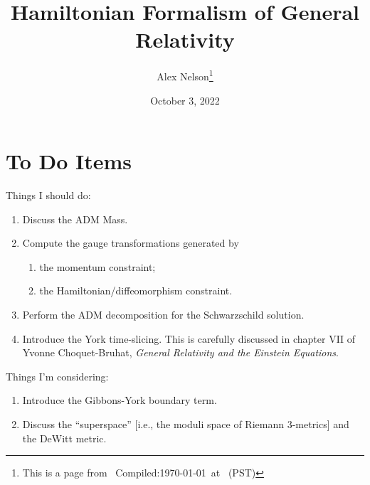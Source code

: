 \documentclass{article}
\title{Hamiltonian Formalism of General Relativity}
\author{Alex Nelson\thanks{This is a page from \homeurl{}\hfil\break\indent\;\, Compiled:\enspace\today\ at \currenttime\ (PST)}}
\date{October 3, 2022}
\numberwithin{equation}{section}
\begin{document}
\maketitle








\section*{To Do Items}

Things I should do:
\begin{enumerate}
\item Discuss the ADM Mass.
\item Compute the gauge transformations generated by
  \begin{enumerate}
  \item the momentum constraint;
  \item the Hamiltonian/diffeomorphism constraint.
  \end{enumerate}
\item Perform the ADM decomposition for the Schwarzschild solution.
\item Introduce the York time-slicing. This is carefully discussed in
  chapter VII of 
  Yvonne Choquet-Bruhat,
  \textit{General Relativity and the Einstein Equations}.
\end{enumerate}

Things I'm considering:
\begin{enumerate}
\item Introduce the Gibbons-York boundary term.
\item Discuss the ``superspace'' [i.e., the moduli space of Riemann
  3-metrics] and the DeWitt metric.
\end{enumerate}

\end{document}
